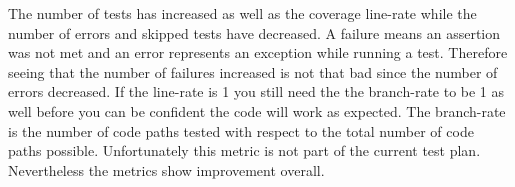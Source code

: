 The number of tests has increased as well as the coverage line-rate while the number of errors and skipped tests have decreased.
A failure means an assertion was not met and an error represents an exception while running a test.
Therefore seeing that the number of failures increased is not that bad since the number of errors decreased.
If the line-rate is 1 you still need the the branch-rate to be 1 as well before you can be confident the code will work as expected.
The branch-rate is the number of code paths tested with respect to the total number of code paths possible.
Unfortunately this metric is not part of the current test plan.
Nevertheless the metrics show improvement overall.

